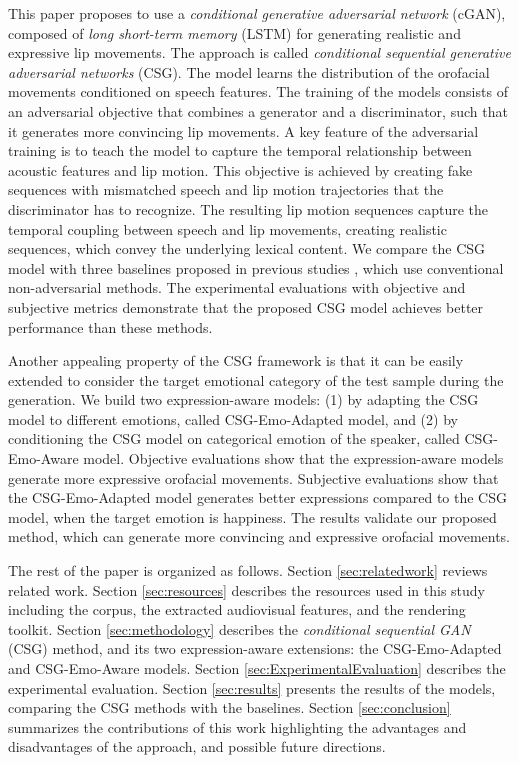 \documentclass[10pt,journal,compsoc]{IEEEtran}
\begin{document}
This paper proposes to use a \emph{conditional generative adversarial network} (cGAN), composed of \emph{long short-term memory} (LSTM) for generating realistic and expressive lip movements. The approach is called \emph{conditional sequential generative adversarial networks} (CSG). The model learns the distribution of the orofacial movements conditioned on speech features. The training of the models consists of an adversarial objective that combines a generator and a discriminator, such that it generates more convincing lip movements. A key  feature of the adversarial training is to teach the model to capture the temporal relationship between acoustic features and lip motion. This objective is achieved by creating fake sequences with mismatched speech and lip motion trajectories that the discriminator has to recognize. The resulting lip motion sequences capture the temporal coupling between speech and lip movements, creating realistic sequences, which convey the underlying lexical content. We compare the CSG model with three baselines proposed in previous studies \cite{Sadoughi_2017,Taylor_2016, Fan_2016}, which use conventional non-adversarial methods. The experimental evaluations with objective and subjective metrics demonstrate that the proposed CSG model achieves better performance than these methods.

Another appealing property of the CSG framework is that it can be easily extended to consider the target emotional category of the test sample during the generation. We build two expression-aware models: (1) by adapting the CSG model to different emotions, called CSG-Emo-Adapted model, and (2) by conditioning the CSG model on categorical emotion of the speaker, called CSG-Emo-Aware model. Objective evaluations show that the expression-aware models generate more expressive orofacial movements. Subjective evaluations show that the CSG-Emo-Adapted model generates better expressions compared to the CSG model, when the target emotion is happiness. The results validate our proposed method, which can generate more convincing and expressive orofacial movements.

The rest of the paper is organized as follows. Section \ref{sec:relatedwork} reviews related work. Section \ref{sec:resources} describes the resources used in this study including the corpus, the extracted audiovisual features, and the rendering toolkit. Section \ref{sec:methodology} describes the \emph{conditional sequential GAN} (CSG) method, and its two expression-aware extensions: the CSG-Emo-Adapted and CSG-Emo-Aware models. Section \ref{sec:ExperimentalEvaluation} describes the experimental evaluation. Section \ref{sec:results} presents the results of the models, comparing the CSG methods with the baselines. Section \ref{sec:conclusion} summarizes the contributions of this work highlighting the advantages and disadvantages of the approach, and possible future directions. 
\end{document}
